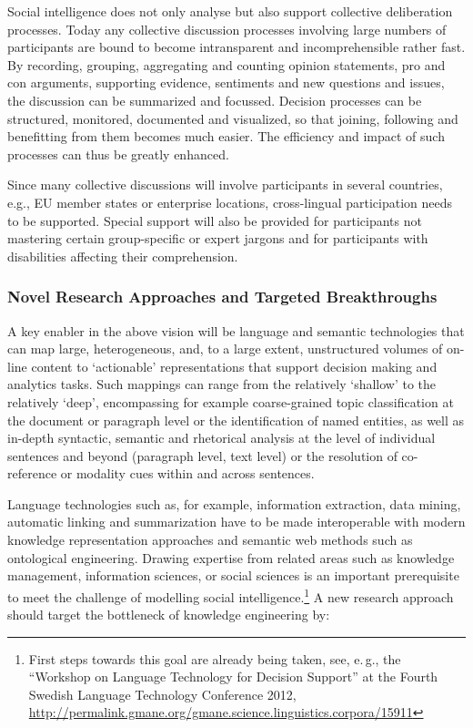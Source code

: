 \documentclass[10pt, plain]{../../metanetpaper}
\begin{document}
\begin{multicols}{2}
Social intelligence does not only analyse but also support collective deliberation processes. Today any collective discussion processes involving large numbers of participants are bound to become intransparent and incomprehensible rather fast. By recording, grouping, aggregating and counting opinion statements, pro and con arguments, supporting evidence, sentiments and new questions and issues, the discussion can be summarized and focussed. Decision processes can be structured, monitored, documented and visualized, so that joining, following and benefitting from them becomes much easier. The efficiency and impact of such processes can thus be greatly enhanced.
 
Since many collective discussions will involve participants in several countries, e.g., EU member states or enterprise locations, cross-lingual participation needs to be supported. Special support will also be provided for participants not mastering certain group-specific or expert jargons and for participants with disabilities affecting their comprehension.

\subsubsection{Novel Research Approaches and Targeted Breakthroughs}
\label{sec:novel-rese-appr-pt2}

A key enabler in the above vision will be language and semantic technologies that can map large, heterogeneous, and, to a large extent, unstructured volumes of on-line content to ‘actionable’ representations that support decision making and analytics tasks. Such mappings can range from the relatively ‘shallow’ to the relatively ‘deep’, encompassing for example coarse-grained topic classification at the document or paragraph level or the identification of named entities, as well as in-depth syntactic, semantic and rhetorical analysis at the level of individual sentences and beyond (paragraph level, text level) or the resolution of co-reference or modality cues within and across sentences.
 
Language technologies such as, for example, information extraction, data mining, automatic linking and summarization have to be made interoperable with modern knowledge representation approaches and semantic web methods such as ontological engineering. Drawing expertise from related areas such as knowledge management, information sciences, or social sciences is an important prerequisite to meet the challenge of modelling social intelligence.\footnote{First steps towards this goal are already being taken, see, e.\,g., the ``Workshop on Language Technology for Decision Support'' at the Fourth Swedish Language Technology Conference 2012, \url{http://permalink.gmane.org/gmane.science.linguistics.corpora/15911}} A new research approach should target the bottleneck of knowledge engineering by:


\end{multicols}
\end{document}
